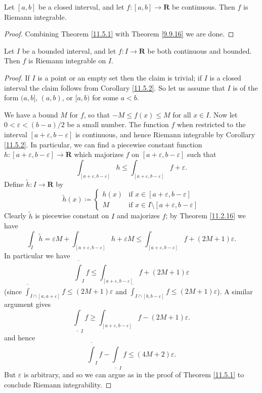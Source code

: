 \begin{corollary}\label{11.5.2}
    Let \([a, b]\) be a closed interval, and let \(f : [a, b] \to \mathbf{R}\) be continuous.
    Then \(f\) is Riemann integrable.
\end{corollary}

\begin{proof}
    Combining Theorem \ref{11.5.1} with Theorem \ref{9.9.16} we are done.
\end{proof}

\begin{proposition}\label{11.5.3}
    Let \(I\) be a bounded interval, and let \(f : I \to \mathbf{R}\) be both continuous and bounded.
    Then \(f\) is Riemann integrable on \(I\).
\end{proposition}

\begin{proof}
    If \(I\) is a point or an empty set then the claim is trivial;
    if \(I\) is a closed interval the claim follows from Corollary \ref{11.5.2}.
    So let us assume that \(I\) is of the form \((a, b]\), \((a, b)\), or \([a, b)\) for some \(a < b\).

    We have a bound \(M\) for \(f\), so that \(-M \leq f(x) \leq M\) for all \(x \in I\).
    Now let \(0 < \varepsilon < (b - a) / 2\) be a small number.
    The function \(f\) when restricted to the interval \([a + \varepsilon, b - \varepsilon]\) is continuous, and hence Riemann integrable by Corollary \ref{11.5.2}.
    In particular, we can find a piecewise constant function \(h : [a + \varepsilon, b - \varepsilon] \to \mathbf{R}\) which majorizes \(f\) on \([a + \varepsilon, b - \varepsilon]\) such that
    \[
        \int_{[a + \varepsilon, b - \varepsilon]} h \leq \int_{[a + \varepsilon, b - \varepsilon]} f + \varepsilon.
    \]
    Define \(\tilde{h} : I \to \mathbf{R}\) by
    \[
        \tilde{h}(x) \coloneqq \begin{cases}
            h(x) & \text{if } x \in [a + \varepsilon, b - \varepsilon]             \\
            M    & \text{if } x \in I \setminus [a + \varepsilon, b - \varepsilon]
        \end{cases}
    \]
    Clearly \(\tilde{h}\) is piecewise constant on \(I\) and majorizes \(f\);
    by Theorem \ref{11.2.16} we have
    \[
        \int_I \tilde{h} = \varepsilon M + \int_{[a + \varepsilon, b - \varepsilon]} h + \varepsilon M \leq \int_{[a + \varepsilon, b - \varepsilon]} f + (2M + 1) \varepsilon.
    \]
    In particular we have
    \[
        \overline{\int}_I f \leq \int_{[a + \varepsilon, b - \varepsilon]} f + (2M + 1) \varepsilon
    \]
    (since \(\overline{\int}_{I \cap [a, a + \varepsilon]} f \leq (2M + 1) \varepsilon\) and \(\overline{\int}_{I \cap [b, b - \varepsilon]} f \leq (2M + 1) \varepsilon\)).
    A similar argument gives
    \[
        \underline{\int}_I f \geq \int_{[a + \varepsilon, b - \varepsilon]} f - (2M + 1) \varepsilon.
    \]
    and hence
    \[
        \overline{\int}_I f - \underline{\int}_I f \leq (4M + 2) \varepsilon.
    \]
    But \(\varepsilon\) is arbitrary, and so we can argue as in the proof of Theorem \ref{11.5.1} to conclude Riemann integrability.
\end{proof}

